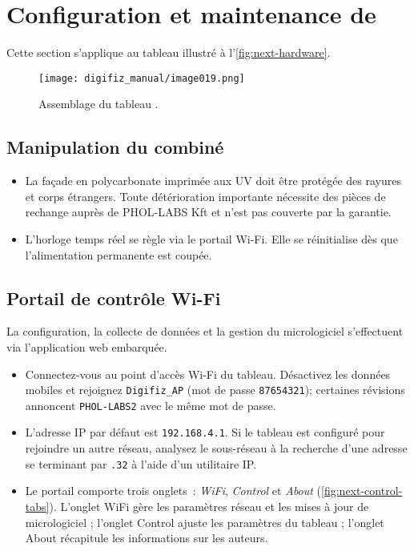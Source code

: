 \chapter{Configuration et maintenance de \ReplicaNextLong{}}\label{ch:replica-next-setup}

Cette section s'applique au tableau \ReplicaNextLong{} illustré à l'\autoref{fig:next-hardware}.

\begin{figure}[htbp]
    \centering
    \texttt{[image: digifiz\_manual/image019.png]}
    \caption{Assemblage du tableau \ReplicaNextLong{}.}
    \label{fig:next-hardware}
\end{figure}

\section{Manipulation du combiné}
\begin{itemize}
    \item La façade en polycarbonate imprimée aux UV doit être protégée des rayures et corps étrangers. Toute détérioration importante nécessite des pièces de rechange auprès de PHOL-LABS Kft et n'est pas couverte par la garantie.
    \item L'horloge temps réel se règle via le portail Wi-Fi. Elle se réinitialise dès que l'alimentation permanente est coupée.
\end{itemize}

\section{Portail de contrôle Wi-Fi}
La configuration, la collecte de données et la gestion du micrologiciel s'effectuent via l'application web embarquée.
\begin{itemize}
    \item Connectez-vous au point d'accès Wi-Fi du tableau. Désactivez les données mobiles et rejoignez \texttt{Digifiz\_AP} (mot de passe \texttt{87654321}); certaines révisions annoncent \texttt{PHOL-LABS2} avec le même mot de passe.
    \item L'adresse IP par défaut est \texttt{192.168.4.1}. Si le tableau est configuré pour rejoindre un autre réseau, analysez le sous-réseau à la recherche d'une adresse se terminant par \texttt{.32} à l'aide d'un utilitaire IP.
    \item Le portail comporte trois onglets~: \emph{WiFi}, \emph{Control} et \emph{About} (\autoref{fig:next-control-tabs}). L'onglet WiFi gère les paramètres réseau et les mises à jour de micrologiciel ; l'onglet Control ajuste les paramètres du tableau ; l'onglet About récapitule les informations sur les auteurs.
\end{itemize}

